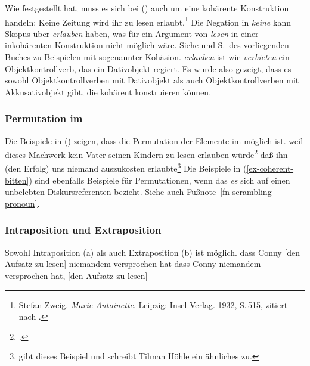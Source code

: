 Wie \citet[]{Askedal88} festgestellt hat, muss es sich bei ()
auch um eine kohärente Konstruktion handeln:
%
%
\ea
Keine Zeitung         wird ihr       zu lesen erlaubt.\footnote{
        Stefan Zweig. \emph{Marie Antoinette}. Leipzig: Insel-Verlag. 1932, S.\,515, 
        zitiert nach .
}
\z
Die Negation in \emph{keine} kann Skopus über \emph{erlauben} haben,
was für ein Argument von \emph{lesen} in einer inkohärenten Konstruktion nicht möglich wäre.
Siehe  und S.\,\pageref{bsp-trauen-kohaerent} des vorliegenden
Buches zu Beispielen mit sogenannter Kohäsion. \emph{erlauben} ist wie \emph{verbieten}
ein Objektkontrollverb, das ein Dativobjekt regiert. Es wurde also gezeigt, dass es sowohl
Objektkontrollverben mit Dativobjekt als auch Objektkontrollverben mit Akkusativobjekt gibt, die
kohärent konstruieren können.


\subsubsection{Permutation im \mf}
\label{sec-obj-contr-perm-mf}

Die Beispiele in () zeigen, dass die Permutation der Elemente im \mf möglich ist.
\eal
\ex{}
weil     dieses Machwerk        kein Vater      seinen Kindern     zu lesen erlauben würde\footnote{
        .
}
\ex 
daß ihn       (den Erfolg) uns      niemand      auszukosten erlaubte\footnote{
        \citet*[]{Haider94b-u} gibt dieses Beispiel und schreibt  Tilman
        Höhle ein ähnliches zu.
}
\zl
Die Beispiele in (\ref{ex-coherent-bitten}) sind ebenfalls Beispiele für Permutationen,
wenn das \emph{es} sich auf einen unbelebten Diskursreferenten bezieht. Siehe auch
Fußnote~\ref{fn-scrambling-pronoun}.


\subsubsection{Intraposition und Extraposition}
\label{sec-obj-contr-ie}

Sowohl Intraposition (a) als auch Extraposition (b) ist möglich.
\eal
\ex 
dass Conny [den Aufsatz zu lesen] niemandem versprochen hat
\ex
dass Conny niemandem versprochen hat, [den Aufsatz zu lesen]
\zl
{}

